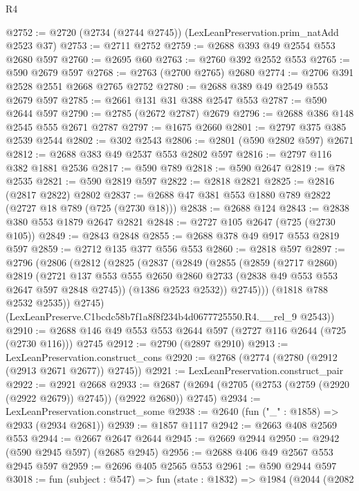 \begin{lexlean}{R4}
\begin{coremodule}
@2752 := @2720 (@2734 (@2744 @2745)) (LexLeanPreservation.prim_natAdd @2523 @37)
@2753 := @2711 @2752
@2759 := @2688 @393 @49 @2554 @553 @2680 @597
@2760 := @2695 @60
@2763 := @2760 @392 @2552 @553
@2765 := @590 @2679 @597
@2768 := @2763 (@2700 @2765) @2680
@2774 := @2706 @391 @2528 @2551 @2668 @2765 @2752
@2780 := @2688 @389 @49 @2549 @553 @2679 @597
@2785 := @2661 @131 @31 @388 @2547 @553
@2787 := @590 @2644 @597
@2790 := @2785 (@2672 @2787) @2679
@2796 := @2688 @386 @148 @2545 @555 @2671 @2787
@2797 := @1675 @2660
@2801 := @2797 @375 @385 @2539 @2544
@2802 := @302 @2543
@2806 := @2801 (@590 @2802 @597) @2671
@2812 := @2688 @383 @49 @2537 @553 @2802 @597
@2816 := @2797 @116 @382 @1881 @2536
@2817 := @590 @789
@2818 := @590 @2647
@2819 := @78 @2535
@2821 := @590 @2819 @597
@2822 := @2818 @2821
@2825 := @2816 (@2817 @2822) @2802
@2837 := @2688 @47 @381 @553 @1880 @789 @2822 (@2727 @18 @789 (@725 (@2730 @18)))
@2838 := @2688 @124
@2843 := @2838 @380 @553 @1879 @2647 @2821
@2848 := @2727 @105 @2647 (@725 (@2730 @105))
@2849 := @2843 @2848
@2855 := @2688 @378 @49 @917 @553 @2819 @597
@2859 := @2712 @135 @377 @556 @553
@2860 := @2818 @597
@2897 := @2796
    (@2806
      (@2812
        (@2825
          (@2837
            (@2849
              (@2855
                (@2859
                  (@2717 @2860)
                  @2819
                  (@2721
                    @137
                    @553
                    @555
                    @2650
                    @2860
                    @2733
                    (@2838 @49 @553 @553 @2647 @597 @2848 @2745))
                  (@1386 @2523 @2532))
                @2745)))
          (@1818 @788 @2532 @2535))
        @2745)
      (LexLeanPreserve.C1bcdc58b7f1a8f8f234b4d0677725550.R4.__rel_9 @2543))
@2910 := @2688 @146 @49 @553 @553 @2644 @597 (@2727 @116 @2644 (@725 (@2730 @116))) @2745
@2912 := @2790 (@2897 @2910)
@2913 := LexLeanPreservation.construct_cons
@2920 := @2768 (@2774 (@2780 (@2912 (@2913 @2671 @2677)) @2745))
@2921 := LexLeanPreservation.construct_pair
@2922 := @2921 @2668
@2933 := @2687 (@2694 (@2705 (@2753 (@2759 (@2920 (@2922 @2679)) @2745)) (@2922 @2680)) @2745)
@2934 := LexLeanPreservation.construct_some
@2938 := @2640 (fun ("_" : @1858) => @2933 (@2934 @2681))
@2939 := @1857 @1117
@2942 := @2663 @408 @2569 @553
@2944 := @2667 @2647 @2644
@2945 := @2669 @2944
@2950 := @2942 (@590 @2945 @597) (@2685 @2945)
@2956 := @2688 @406 @49 @2567 @553 @2945 @597
@2959 := @2696 @405 @2565 @553
@2961 := @590 @2944 @597
@3018 := fun (subject : @547) =>
  fun (state : @1832) =>
  @1984
    (@2044
      (@2082

\end{coremodule}
\end{lexlean}

